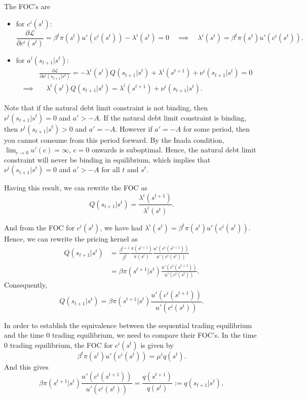 The FOC's are
\begin{itemize}
    \item for $c^i(s^t)$:
    \[
    \frac{\partial \mathcal{L}}{\partial c^i(s^t)} = \beta^t \pi(s^t) u'(c^i(s^t)) - \lambda^i(s^t) = 0 \quad \implies \quad \lambda^i(s^t) = \beta^t \pi(s^t) u'(c^i(s^t)).
    \]
    \item for $a^i(s_{t+1}|s^t)$:
    \[
    \begin{aligned}
        & \frac{\partial \mathcal{L}}{\partial a^i(s_{t+1}|s^t)} = -\lambda^i(s^t) Q(s_{t+1}|s^t) + \lambda^i(s^{t+1}) + \nu^i(s_{t+1}|s^t) = 0\\
        \implies & \quad \lambda^i(s^t) Q(s_{t+1}|s^t) = \lambda^i(s^{t+1}) + \nu^i(s_{t+1}|s^t).
    \end{aligned}
    \]
\end{itemize}

Note that if the natural debt limit constraint is not binding, then $\nu^i(s_{t+1}|s^t) = 0$ and $a'>-A$. If the natural debt limit constraint is binding, then $\nu^i(s_{t+1}|s^t) > 0$ and $a' = -A$. However if $a' = -A$ for some period, then you cannot consume from this period forward. By the Inada condition, $\lim_{c\to 0}u'(c) = \infty$, $c = 0$ onwards is suboptimal. Hence, the natural debt limit constraint will never be binding in equilibrium, which implies that $\nu^i(s_{t+1}|s^t) = 0$ and $a'>-A$ for all $t$ and $s^t$.

Having this result, we can rewrite the FOC as 
\[
Q(s_{t+1}|s^t) = \frac{\lambda^i(s^{t+1})}{\lambda^i(s^t)}.
\]

And from the FOC for $c^i(s^t)$, we have had $\lambda^i(s^t) = \beta^t \pi(s^t) u'(c^i(s^t))$. Hence, we can rewrite the pricing kernel as
\[
\begin{aligned}
    Q(s_{t+1}|s^t) & = \frac{\beta^{t+1}}{\beta^t}\frac{\pi(s^{t+1})}{\pi(s^t)}\frac{u'(c^i(s^{t+1}))}{u'(c^i(s^t))}  \\
    & =  \beta \pi(s^{t+1}|s^t)\frac{u'(c^i(s^{t+1}))}{u'(c^i(s^t))}.
\end{aligned}
\]
Consequently,
\[
Q(s_{t+1}|s^t) = \beta \pi(s^{t+1}|s^t)\frac{u'(c^i(s^{t+1}))}{u'(c^i(s^t))}.
\]

In order to establish the equivalence between the sequential trading equilibrium and the time 0 trading equilibrium, we need to compare their FOC's. In the time 0 trading equilibrium, the FOC for $c^i(s^t)$ is given by
\[
\beta^t \pi(s^t) u'(c^i(s^t)) = \mu^i q(s^t).
\]
And this gives
\[
\beta \pi(s^{t+1}|s^t)\frac{u'(c^i(s^{t+1}))}{u'(c^i(s^t))} =  \frac{q(s^{t+1})}{q(s^t)} := q(s_{t+1}|s^t),
\]

